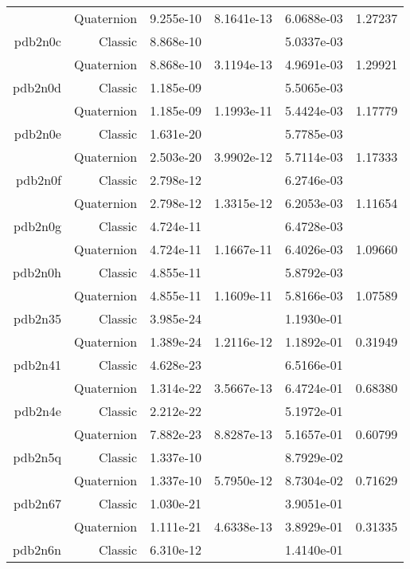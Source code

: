 \begin{xltabular}{\textwidth}{r|rS[table-format=1.3e+2]S[table-format=1.4e+2]S[table-format=1.4e+2]S[table-format=-1.5]}
& Quaternion & 9.255e-10 & 8.1641e-13 & 6.0688e-03 & 1.27237\\  \addlinespace
pdb2n0c & Classic & 8.868e-10 &  & 5.0337e-03 & \\
& Quaternion & 8.868e-10 & 3.1194e-13 & 4.9691e-03 & 1.29921\\  \addlinespace
pdb2n0d & Classic & 1.185e-09 &  & 5.5065e-03 & \\
& Quaternion & 1.185e-09 & 1.1993e-11 & 5.4424e-03 & 1.17779\\  \addlinespace
pdb2n0e & Classic & 1.631e-20 &  & 5.7785e-03 & \\
& Quaternion & 2.503e-20 & 3.9902e-12 & 5.7114e-03 & 1.17333\\  \addlinespace
pdb2n0f & Classic & 2.798e-12 &  & 6.2746e-03 & \\
& Quaternion & 2.798e-12 & 1.3315e-12 & 6.2053e-03 & 1.11654\\  \addlinespace
pdb2n0g & Classic & 4.724e-11 &  & 6.4728e-03 & \\
& Quaternion & 4.724e-11 & 1.1667e-11 & 6.4026e-03 & 1.09660\\  \addlinespace
pdb2n0h & Classic & 4.855e-11 &  & 5.8792e-03 & \\
& Quaternion & 4.855e-11 & 1.1609e-11 & 5.8166e-03 & 1.07589\\  \addlinespace
pdb2n35 & Classic & 3.985e-24 &  & 1.1930e-01 & \\
& Quaternion & 1.389e-24 & 1.2116e-12 & 1.1892e-01 & 0.31949\\  \addlinespace
pdb2n41 & Classic & 4.628e-23 &  & 6.5166e-01 & \\
& Quaternion & 1.314e-22 & 3.5667e-13 & 6.4724e-01 & 0.68380\\  \addlinespace
pdb2n4e & Classic & 2.212e-22 &  & 5.1972e-01 & \\
& Quaternion & 7.882e-23 & 8.8287e-13 & 5.1657e-01 & 0.60799\\  \addlinespace
pdb2n5q & Classic & 1.337e-10 &  & 8.7929e-02 & \\
& Quaternion & 1.337e-10 & 5.7950e-12 & 8.7304e-02 & 0.71629\\  \addlinespace
pdb2n67 & Classic & 1.030e-21 &  & 3.9051e-01 & \\
& Quaternion & 1.111e-21 & 4.6338e-13 & 3.8929e-01 & 0.31335\\  \addlinespace
pdb2n6n & Classic & 6.310e-12 &  & 1.4140e-01 & \\

\end{xltabular}

